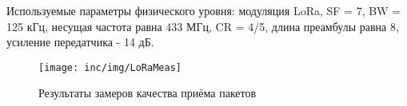 Используемые параметры физического уровня: модуляция LoRa, SF = 7, BW = 125 
кГц, несущая частота равна 433 МГц, CR = 4/5, длина преамбулы равна 8, усиление 
передатчика - 14 дБ.

\begin{figure}[!h]
  \centering
  \texttt{[image: inc/img/LoRaMeas]}
  \caption{Результаты замеров качества приёма пакетов}
  \label{fig:measmap}
\end{figure}